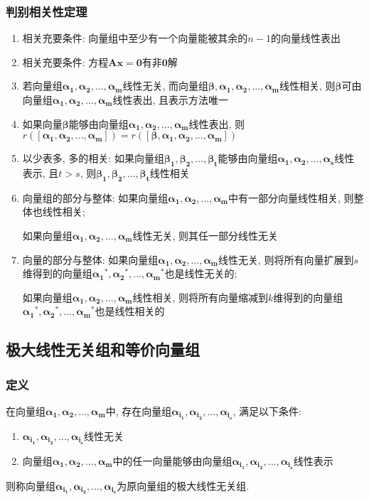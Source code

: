 \subsubsection{判别相关性定理}
\begin{enumerate}
\item 相关充要条件: 向量组中至少有一个向量能被其余的$ n-1 $的向量线性表出
\item 相关充要条件: 方程$ \bm{A}\bm{x}=\bm{0} $有非$ \bm{0} $解
\item 若向量组$ \bm{\alpha_{1}},\bm{\alpha_{2}},...,\bm{\alpha_{m}} $线性无关, 而向量组$ \bm{\beta}, \bm{\alpha_{1}},\bm{\alpha_{2}},...,\bm{\alpha_{m}} $线性相关, 则$ \bm{\beta} $可由向量组$ \bm{\alpha_{1}},\bm{\alpha_{2}},...,\bm{\alpha_{m}} $线性表出, 且表示方法唯一\label{ref:判别相关性}
\item 如果向量$ \bm{\beta} $能够由向量组$ \bm{\alpha_{1}},\bm{\alpha_{2}},...,\bm{\alpha_{m}} $线性表出, 则$ r([\bm{\alpha_{1}},\bm{\alpha_{2}},...,\bm{\alpha_{m}}])=r([\bm{\beta},\bm{\alpha_{1}},\bm{\alpha_{2}},...,\bm{\alpha_{m}}]) $
\item 以少表多, 多的相关: 如果向量组$ \bm{\beta_{1}},\bm{\beta_{2}},...,\bm{\beta_{t}} $能够由向量组$ \bm{\alpha_{1}},\bm{\alpha_{2}},...,\bm{\alpha_{s}} $线性表示, 且$ t>s $, 则$ \bm{\beta_{1}},\bm{\beta_{2}},...,\bm{\beta_{t}} $线性相关
\item 向量组的部分与整体: 如果向量组$ \bm{\alpha_{1}},\bm{\alpha_{2}},...,\bm{\alpha_{m}} $中有一部分向量线性相关, 则整体也线性相关;\par 如果向量组$ \bm{\alpha_{1}},\bm{\alpha_{2}},...,\bm{\alpha_{m}} $线性无关, 则其任一部分线性无关
\item 向量的部分与整体: 如果向量组$ \bm{\alpha_{1}},\bm{\alpha_{2}},...,\bm{\alpha_{m}} $线性无关, 则将所有向量扩展到$ s $维得到的向量组$ \bm{\alpha_{1}}^{*},\bm{\alpha_{2}}^{*},...,\bm{\alpha_{m}}^{*} $也是线性无关的;\par 如果向量组$ \bm{\alpha_{1}},\bm{\alpha_{2}},...,\bm{\alpha_{m}} $线性相关, 则将所有向量缩减到$ k $维得到的向量组$ \bm{\alpha_{1}}^{*},\bm{\alpha_{2}}^{*},...,\bm{\alpha_{m}}^{*} $也是线性相关的
\end{enumerate}
\subsection{极大线性无关组和等价向量组}
\subsubsection{定义}
在向量组$ \bm{\alpha_{1}},\bm{\alpha_{2}},...,\bm{\alpha_{m}} $中, 存在向量组$ \bm{\alpha_{i_{1}}},\bm{\alpha_{i_{2}}},...,\bm{\alpha_{i_{s}}} $, 满足以下条件:
\begin{enumerate}
\item $ \bm{\alpha_{i_{1}}},\bm{\alpha_{i_{2}}},...,\bm{\alpha_{i_{s}}} $线性无关
\item 向量组$ \bm{\alpha_{1}},\bm{\alpha_{2}},...,\bm{\alpha_{m}} $中的任一向量能够由向量组$ \bm{\alpha_{i_{1}}},\bm{\alpha_{i_{2}}},...,\bm{\alpha_{i_{s}}} $线性表示
\end{enumerate}\par
则称向量组$ \bm{\alpha_{i_{1}}},\bm{\alpha_{i_{2}}},...,\bm{\alpha_{i_{s}}} $为原向量组的极大线性无关组.
